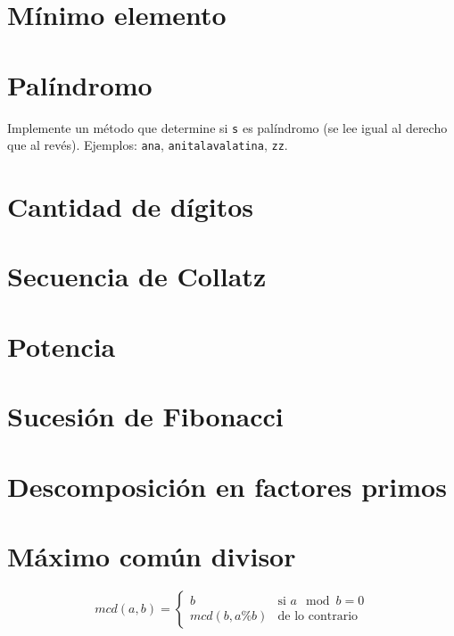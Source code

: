 \section{Mínimo elemento}


\section{Palíndromo}
Implemente un método que determine si \texttt{s} es palíndromo (se lee igual al derecho que al revés). Ejemplos: \texttt{ana}, \texttt{anitalavalatina}, \texttt{zz}.

\section{Cantidad de dígitos}


\section{Secuencia de Collatz}


\section{Potencia}



\section{Sucesión de Fibonacci}


\section{Descomposición en factores primos}


\section{Máximo común divisor}


\[ mcd(a, b) = \begin{cases}
b & \text{si } a \mod b = 0 \\
mcd(b, a \% b) & \text{de lo contrario}
\end{cases} \]

